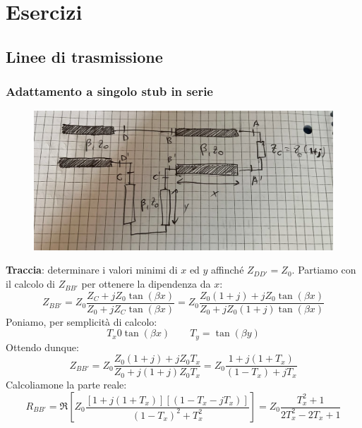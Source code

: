 \documentclass{book}
\begin{document}
\chapter{Esercizi}
    \section{Linee di trasmissione}
        \subsection{Adattamento a singolo stub in serie}
            \begin{figure}[h!]
                \center 
                \includegraphics[width=0.75\linewidth]{Chapter_two/Chapt2img21.png}
            \end{figure}
        \textbf{Traccia}: determinare i valori minimi di $x$ ed $y$ affinché $Z_{DD'}=Z_{0}$.
        Partiamo con il calcolo di $Z_{BB'}$ per ottenere la dipendenza da $x$:
        \begin{equation}
            Z_{BB'} = Z_{0} \frac{Z_{C}+jZ_{0}\tan(\beta x)}{Z_{0}+jZ_{C}\tan(\beta x)} =
            Z_{0} \frac{Z_{0}(1+j)+jZ_{0}\tan(\beta x)}{Z_{0}+jZ_{0}(1+j)\tan(\beta x)}
        \end{equation}
        Poniamo, per semplicità di calcolo:
        \begin{equation}
            T_{x}0\tan(\beta x) \qquad T_{y}=\tan(\beta y)
         \end{equation}
         Ottendo dunque:
         \begin{equation}
            Z_{BB'} = Z_{0} \frac{Z_{0}(1+j)+jZ_{0}T_{x}}{Z_{0}+j(1+j)Z_{0}T_{x}} = Z_{0}\frac{1+j(1+T_{x})}{(1-T_{x})+jT_{x}}
         \end{equation}
         Calcoliamone la parte reale:
         \begin{equation}
            R_{BB'} = \Re[Z_{0} \frac{[1+j(1+T_{x})][(1-T_{x}-jT_{x})]}{(1-T_{x})^{2}+T_{x} ^{2}}] = Z_{0}\frac{T_{x} ^{2}+1}{2T_{x} ^{2}-2T_{x}+1}
         \end{equation}
\end{document}
